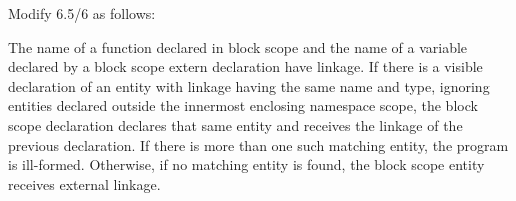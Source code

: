 \noindent
Modify 6.5/6 as follows:
\begin{std.txt}
\resetalinea[5]
\alinea
The name of a function declared in block scope and the name of a
variable declared by a block scope extern declaration have linkage.
If there is a visible declaration of an entity with linkage having the
same name and type, ignoring entities declared outside the innermost
enclosing namespace scope, the block scope declaration declares that
same entity and receives the linkage of the previous declaration. 
If
there is more than one such matching entity, the program is
ill-formed. Otherwise, if no matching entity is found, the block scope
entity receives external linkage.
\end{std.txt}

